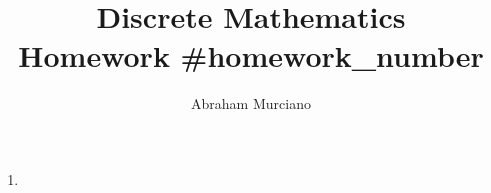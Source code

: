 \documentclass[fleqn]{article}
\title{Discrete Mathematics \\
\medskip
\large Homework #{homework_number}}
\author{Abraham Murciano}
\newenvironment{answers}{ %
	\begin{enumerate}
		\setlength{\itemsep}{\bigskipamount}
}{\end{enumerate}}
\begin{document}
\maketitle

\begin{answers}

    \item

\end{answers}
\end{document}
